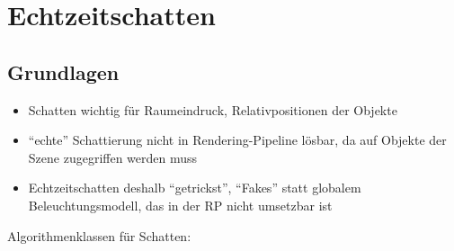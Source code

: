 \documentclass[a4paper, 12pt]{article}
\begin{document}
\section{Echtzeitschatten}


\subsection{Grundlagen}
\begin{itemize}
  \item Schatten wichtig für Raumeindruck, Relativpositionen der Objekte
  \item ``echte'' Schattierung nicht in Rendering-Pipeline lösbar, da auf Objekte der Szene zugegriffen werden muss
  \item Echtzeitschatten deshalb ``getrickst'', ``Fakes'' statt globalem Beleuchtungsmodell, das in der RP nicht umsetzbar ist
\end{itemize}
Algorithmenklassen für Schatten:
\end{document}
